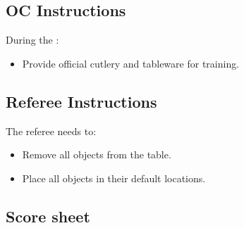 \subsection*{OC Instructions}

During the \SetupDays:
\begin{itemize}
	\item Provide official cutlery and tableware for training.
\end{itemize}

\subsection*{Referee Instructions}

The referee needs to:
\begin{itemize}
	\item Remove all objects from the table.
	\item Place all objects in their default locations.
\end{itemize}

\subsection*{Score sheet}


